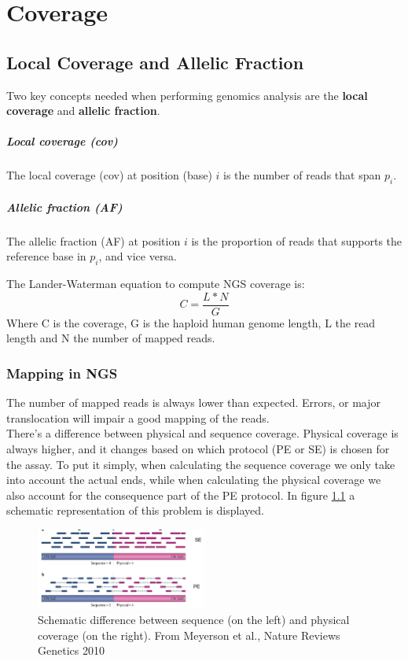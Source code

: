 \graphicspath{{chapters/notes/02/images}}
\chapter{Coverage}
\section{Local Coverage and Allelic Fraction}
Two key concepts needed when performing genomics analysis are the \textbf{local coverage} and \textbf{allelic fraction}.

	\paragraph*{Local coverage (cov)}
		The local coverage (cov) at position (base) $i$ is the number of reads that span $p_i$.
	\paragraph*{Allelic fraction (AF)}
		The allelic fraction (AF) at position $i$ is the proportion of reads that supports 			the reference base in $p_i$, and vice versa.

The Lander-Waterman equation to compute NGS coverage is:
\begin{equation}
C = \frac{L * N}{G}
\end{equation}
Where C is the coverage, G is the haploid human genome length, L the read length and N the number of mapped reads.

\subsection{Mapping in NGS}
The number of mapped reads is always lower than expected. Errors, or major translocation will impair a good mapping of the reads. \\
There's a difference between physical and sequence coverage. Physical coverage is always higher, and it changes based on which protocol (PE or SE) is chosen for the assay.
To put it simply, when calculating the sequence coverage we only take into account the actual ends, while when calculating the physical coverage we also account for the consequence part of the PE protocol. In figure \ref{fig:seq_phys} a  schematic representation of this problem is displayed.
\begin{figure}[H]
    \centering
    \includegraphics[width=0.5\textwidth]{seq_phys.png}
    \caption{Schematic difference between sequence (on the left) and physical coverage (on the right). From Meyerson et al., Nature Reviews Genetics 2010}
    \label{fig:seq_phys}
\end{figure}

